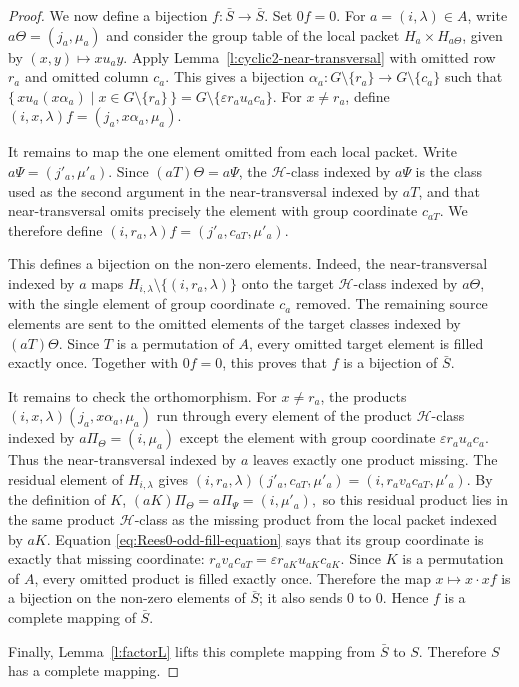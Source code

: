 \documentclass[11pt]{article}
\theoremstyle{plain}
\theoremstyle{remark}
\theoremstyle{definition}
\theoremstyle{plain}
\begin{document}
\begin{proof}
We now define a bijection $f\colon \bar S\longrightarrow\bar S$. Set $0f=0$. For
$a=(i,\lambda)\in A$, write $a\Theta=(j_a,\mu_a)$ and consider the group table of the local packet $H_a\times H_{a\Theta}$, given by
\((x,y)\longmapsto xu_ay.\)
Apply Lemma~\ref{l:cyclic2-near-transversal} with omitted row $r_a$ and omitted
column $c_a$. This gives a bijection
\(\alpha_a\colon G\setminus\{r_a\}\longrightarrow G\setminus\{c_a\}\)
such that
\(\{\,xu_a(x\alpha_a)\mid x\in G\setminus\{r_a\}\,\} = G\setminus\{\varepsilon r_au_ac_a\}.\)
For $x\ne r_a$, define
\((i,x,\lambda)f=(j_a,x\alpha_a,\mu_a).\)

It remains to map the one element omitted from each local packet. Write
$a\Psi=(j'_a,\mu'_a)$. Since $(aT)\Theta=a\Psi$, the $\mathcal{H}$-class indexed by
$a\Psi$ is the class used as the second argument in the near-transversal indexed by $aT$, and that
near-transversal omits precisely the element with group coordinate $c_{aT}$.
We therefore define
\((i,r_a,\lambda)f=(j'_a,c_{aT},\mu'_a).\)

This defines a bijection on the non-zero elements. Indeed, the
near-transversal indexed by $a$ maps $H_{i,\lambda} \setminus
\{(i,r_a,\lambda)\}$ onto the target $\mathcal H$-class indexed by
$a\Theta$, with the single element of group coordinate $c_a$ removed. The
remaining source elements are sent to the omitted elements of the target classes
indexed by $(aT)\Theta$. Since $T$ is a permutation of $A$, every omitted target
element is filled exactly once. Together with $0f=0$, this proves that $f$ is a
bijection of $\bar S$.

It remains to check the orthomorphism. For $x\ne r_a$, the products
\((i,x,\lambda)(j_a,x\alpha_a,\mu_a)\)
run through every element of the product $\mathcal H$-class indexed by
\(a\Pi_\Theta=(i,\mu_a)\)
except the element with group coordinate
\(\varepsilon r_au_ac_a.\)
Thus the near-transversal indexed by $a$ leaves exactly one product missing.
The residual element of $H_{i,\lambda}$ gives
\((i,r_a,\lambda)(j'_a,c_{aT},\mu'_a) = (i,r_av_ac_{aT},\mu'_a).\)
By the definition of $K$,
\((aK)\Pi_\Theta=a\Pi_\Psi=(i,\mu'_a),\)
so this residual product lies in the same product $\mathcal H$-class as the
missing product from the local packet indexed by $aK$. Equation
\eqref{eq:Rees0-odd-fill-equation} says that its group coordinate is exactly
that missing coordinate:
\(r_av_ac_{aT} = \varepsilon r_{aK}u_{aK}c_{aK}.\)
Since $K$ is a permutation of $A$, every omitted product is filled exactly once.
Therefore the map $x\mapsto x\cdot xf$ is a bijection on the non-zero elements
of $\bar S$; it also sends $0$ to $0$. Hence $f$ is a complete mapping of
$\bar S$.

Finally, Lemma~\ref{l:factorL} lifts this complete mapping from $\bar S$ to
$S$. Therefore $S$ has a complete mapping.
\end{proof}
\end{document}
